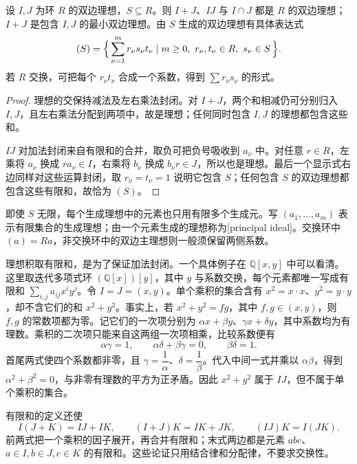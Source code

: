 \begin{proposition}\label{b1:prop:ideal-operations}
	设 \(I,J\) 为环 \(R\) 的双边理想，\(S\subseteq R\)。则 \(I+J\)、\(IJ\) 与 \(I\cap J\) 都是 \(R\) 的双边理想；\(I+J\) 是包含 \(I,J\) 的最小双边理想。由 \(S\) 生成的双边理想有具体表达式
	\[
		(S)=\Bigl\{\,\sum_{\nu=1}^m r_\nu s_\nu t_\nu \mid m\geq0,\ r_\nu,t_\nu\in R,\ s_\nu\in S\,\Bigr\}.
	\]
	若 \(R\) 交换，可把每个 \(r_\nu t_\nu\) 合成一个系数，得到 \(\sum r_\nu s_\nu\) 的形式。
\end{proposition}
\begin{proof}
	理想的交保持减法及左右乘法封闭。对 \(I+J\)，两个和相减仍可分别归入 \(I,J\)，且左右乘法分配到两项中，故是理想；任何同时包含 \(I,J\) 的理想都包含这些和。

	\(IJ\) 对加法封闭来自有限和的合并，取负可把负号吸收到 \(a_\nu\) 中。对任意 \(r\in R\)，左乘将 \(a_\nu\) 换成 \(ra_\nu\in I\)，右乘将 \(b_\nu\) 换成 \(b_\nu r\in J\)，所以也是理想。最后一个显示式右边同样对这些运算封闭，取 \(r_\nu=t_\nu=1\) 说明它包含 \(S\)；任何包含 \(S\) 的双边理想都包含这些有限和，故恰为 \((S)\)。
\end{proof}
即使 \(S\) 无限，每个生成理想中的元素也只用有限多个生成元。写 \((a_1,\ldots,a_m)\) 表示有限集合的生成理想；由一个元素生成的理想称为[principal ideal]。交换环中 \((a)=Ra\)，非交换环中的双边主理想则一般须保留两侧系数。

\ProseParagraphBreak
理想积取有限和，是为了保证加法封闭。一个具体例子在 \(\mathbb Q[x,y]\) 中可以看清。这里取迭代多项式环 \((\mathbb Q[x])[y]\)，其中 \(y\) 与系数交换，每个元素都唯一写成有限和 \(\sum_{i,j}a_{ij}x^iy^j\)。令 \(I=J=(x,y)\)。单个乘积的集合含有 \(x^2=x\cdot x\)、\(y^2=y\cdot y\)，却不含它们的和 \(x^2+y^2\)。事实上，若 \(x^2+y^2=fg\)，其中 \(f,g\in(x,y)\)，则 \(f,g\) 的常数项都为零。记它们的一次项分别为 \(\alpha x+\beta y\)、\(\gamma x+\delta y\)，其中系数均为有理数。乘积的二次项只能来自这两组一次项相乘，比较系数便有
\[
	\alpha\gamma=1,\qquad \alpha\delta+\beta\gamma=0,\qquad \beta\delta=1.
\]
首尾两式使四个系数都非零，且 \(\gamma=\dfrac1\alpha\)、\(\delta=\dfrac1\beta\)。代入中间一式并乘以 \(\alpha\beta\)，得到 \(\alpha^2+\beta^2=0\)，与非零有理数的平方为正矛盾。因此 \(x^2+y^2\) 属于 \(IJ\)，但不属于单个乘积的集合。

\ProseParagraphBreak
有限和的定义还使
\[
	I(J+K)=IJ+IK,\qquad (I+J)K=IK+JK,\qquad (IJ)K=I(JK).
\]
前两式把一个乘积的因子展开，再合并有限和；末式两边都是元素 \(abc\)、\(a\in I,b\in J,c\in K\) 的有限和。这些论证只用结合律和分配律，不要求交换性。

